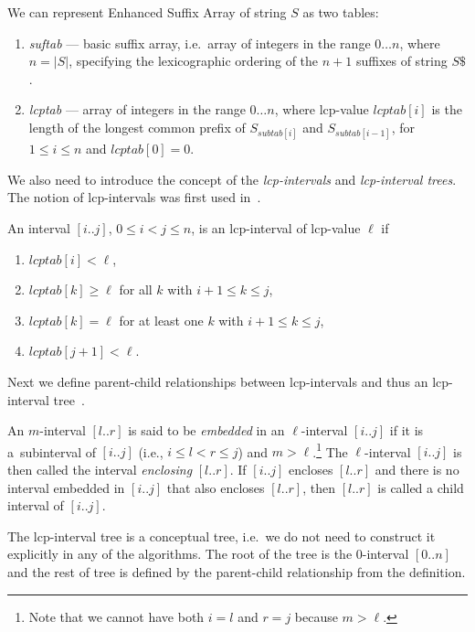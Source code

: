 We can represent Enhanced Suffix Array of string $S$ as two tables:
\begin{enumerate}
  \item \emph{suftab} --- basic suffix array, i.e.\ array of integers in the range $0\dots n$, where $n = |S|$, specifying the lexicographic ordering of the $n + 1$ suffixes of string $S\$ $.
  \item \emph{lcptab} --- array of integers in the range $0\dots n$, where lcp-value $lcptab[i]$ is the length of the longest common prefix of $S_{subtab[i]}$ and $S_{subtab[i-1]}$, for $1 \leq i \leq n$ and $lcptab[0] = 0$.
\end{enumerate}

We also need to introduce the concept of the \emph{lcp-intervals} and \emph{lcp-interval trees}. The notion of lcp-intervals was first used in~\cite{enhancedsuffixarrays}.
\begin{definition}
An interval $[i..j]$, $0 \leq i < j \leq n$, is an lcp-interval of lcp-value $\ell$ if

\begin{enumerate}
\item $lcptab[i] < \ell$,
\item $lcptab[k] \geq \ell$ for all $k$ with $i + 1 \leq k \leq j$,
\item $lcptab[k] = \ell$ for at least one $k$ with $i + 1 \leq k \leq j$,
\item $lcptab[j + 1] < \ell$.
\end{enumerate}
\end{definition}

Next we define parent-child relationships between lcp-intervals and thus an lcp-interval tree~\cite{enhancedsuffixarrays}.

\begin{definition}
  An $m$-interval $[l..r]$ is said to be \emph{embedded} in an $\ell$-interval $[i..j]$ if it is a~subinterval of $[i..j]$ (i.e., $i \leq l < r \leq j $) and $m > \ell$.\footnote{Note that we cannot have both $i = l$ and $r = j$ because $m > \ell$.}
  The $\ell$-interval $[i..j ]$ is then called the interval \emph{enclosing} $[l..r]$. If $[i..j]$ encloses $[l..r]$ and there is no interval embedded in $[i..j]$ that also encloses $[l..r]$, then $[l..r]$ is called a child interval of $[i..j]$.
\end{definition}

The lcp-interval tree is a conceptual tree, i.e.\ we do not need to construct it explicitly in any of the algorithms. The root of the tree is the $0$-interval $[0..n]$ and the rest of tree is defined by the parent-child relationship from the definition.

